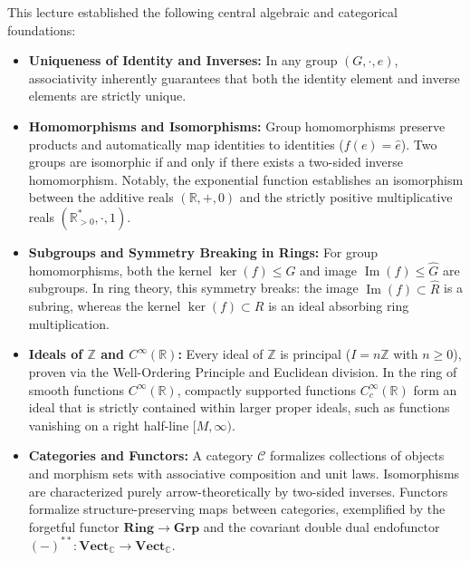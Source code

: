 \begin{overview}
This lecture established the following central algebraic and categorical foundations:
\begin{itemize}
    \item \textbf{Uniqueness of Identity and Inverses:} In any group $(G, \cdot, e)$, associativity inherently guarantees that both the identity element and inverse elements are strictly unique.
    \item \textbf{Homomorphisms and Isomorphisms:} Group homomorphisms preserve products and automatically map identities to identities ($f(e) = \hat{e}$). Two groups are isomorphic if and only if there exists a two-sided inverse homomorphism. Notably, the exponential function establishes an isomorphism between the additive reals $(\mathbb{R}, +, 0)$ and the strictly positive multiplicative reals $(\mathbb{R}^*_{>0}, \cdot, 1)$.
    \item \textbf{Subgroups and Symmetry Breaking in Rings:} For group homomorphisms, both the kernel $\operatorname{ker}(f) \le G$ and image $\operatorname{Im}(f) \le \hat{G}$ are subgroups. In ring theory, this symmetry breaks: the image $\operatorname{Im}(f) \subset \hat{R}$ is a subring, whereas the kernel $\operatorname{ker}(f) \subset R$ is an ideal absorbing ring multiplication.
    \item \textbf{Ideals of $\mathbb{Z}$ and $C^\infty(\mathbb{R})$:} Every ideal of $\mathbb{Z}$ is principal ($I = n\mathbb{Z}$ with $n \ge 0$), proven via the Well-Ordering Principle and Euclidean division. In the ring of smooth functions $C^\infty(\mathbb{R})$, compactly supported functions $C_c^\infty(\mathbb{R})$ form an ideal that is strictly contained within larger proper ideals, such as functions vanishing on a right half-line $[M, \infty)$.
    \item \textbf{Categories and Functors:} A category $\mathcal{C}$ formalizes collections of objects and morphism sets with associative composition and unit laws. Isomorphisms are characterized purely arrow-theoretically by two-sided inverses. Functors formalize structure-preserving maps between categories, exemplified by the forgetful functor $\mathbf{Ring} \to \mathbf{Grp}$ and the covariant double dual endofunctor $(-)^{**} \colon \mathbf{Vect}_{\mathbb{C}} \to \mathbf{Vect}_{\mathbb{C}}$.
\end{itemize}
\end{overview}